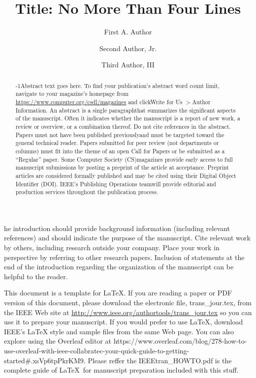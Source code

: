 \documentclass{IEEEcsmag}
\begin{document}

\title{Title: No More Than Four Lines}

\author{First A. Author}

\author{Second Author, Jr.}

\author{Third Author, III}


\begin{abstract}
\looseness-1Abstract text goes here. To find your publication's abstract word count limit, navigate to your magazine's homepage from \url{https://www.computer.org/csdl/magazines} and clickWrite for Us $>$Author Information. An abstract is a single paragraphthat summarizes the significant aspects of the manuscript. Often it indicates whether the manuscript is a report of new work, a review or overview, or a combination thereof. Do not cite references in the abstract. Papers must not have been published previouslyand must be targeted toward the general technical reader. Papers submitted for peer review (not departments or columns) must fit into the theme of an open Call for Papers or be submitted as a ``Regular'' paper. Some Computer Society (CS)magazines provide early access to full manuscript submissions by posting a preprint of the article at acceptance. Preprint articles are considered formally published and may be cited using their Digital Object Identifier (DOI). IEEE's Publishing Operations teamwill provide editorial and production services throughout the publication process.
\end{abstract}

\maketitle


he introduction should provide background information (including relevant references) and should indicate the purpose of the manuscript. Cite relevant work by others, including research outside your company. Place your work in perspective by referring to other research papers. Inclusion of statements at the end of the introduction regarding the organization of the manuscript can be helpful to the reader.


This document is a template for \LaTeX. If you are reading a paper or PDF version of this document, please download the electronic file, trans\_jour.tex, from the IEEE Web site at \url{http://www.ieee.org/authortools/trans_jour.tex} so you can use it to prepare your manuscript. If you would prefer to use LaTeX, download IEEE's LaTeX style and sample files from the same Web page. You can also explore using the Overleaf editor at {https://www.overleaf.com/blog/278-how-to-use-overleaf-with-ieee-collabratec-your-quick-guide-to-getting-started\#.xsVp6tpPkrKM9}. Please reffer the IEEEtran\_HOWTO.pdf is the complete guide of \LaTeX\ for manuscript preparation included with this stuff.
\end{document}
